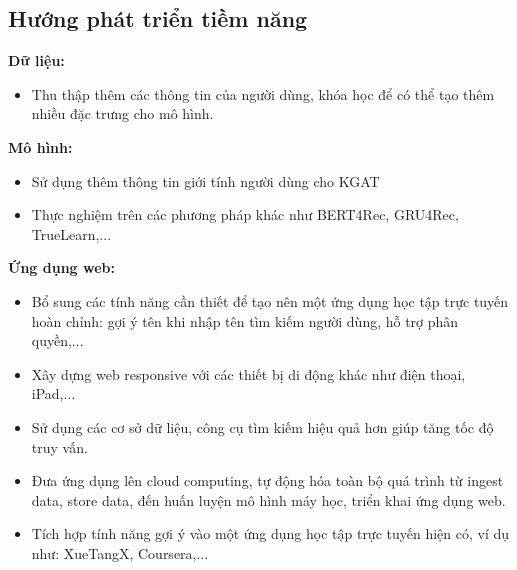 \subsection{Hướng phát triển tiềm năng}
\textbf{Dữ liệu:} 
\begin{itemize}
    \item Thu thập thêm các thông tin của người dùng, khóa học để có thể tạo thêm nhiều đặc trưng cho mô hình.
\end{itemize}
\textbf{Mô hình:}
\begin{itemize}
    \item Sử dụng thêm thông tin giới tính người dùng cho KGAT
    \item Thực nghiệm trên các phương pháp khác như BERT4Rec, GRU4Rec, TrueLearn,...
\end{itemize}
\textbf{Ứng dụng web:} 
\begin{itemize}
    \item Bổ sung các tính năng cần thiết để tạo nên một ứng dụng học tập trực tuyến hoàn chỉnh: gợi ý tên khi nhập tên tìm kiếm người dùng, hỗ trợ phân quyền,...
    \item Xây dựng web responsive với các thiết bị di động khác như điện thoại, iPad,...
    \item Sử dụng các cơ sở dữ liệu, công cụ tìm kiếm hiệu quả hơn giúp tăng tốc độ truy vấn.
    \item Đưa ứng dụng lên cloud computing, tự động hóa toàn bộ quá trình từ ingest data, store data, đến huấn luyện mô hình máy học, triển khai ứng dụng web.
    \item Tích hợp tính năng gợi ý vào một ứng dụng học tập trực tuyến hiện có, ví dụ như: XueTangX, Coursera,...
\end{itemize}
